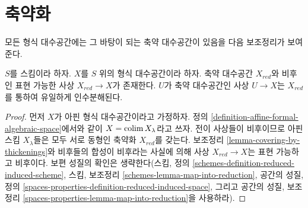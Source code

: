 \section{축약화}
\label{section-reduction}

\noindent
모든 형식 대수공간에는 그 바탕이 되는 축약 대수공간이 있음을 다음
보조정리가 보여 준다.

\begin{lemma}
\label{lemma-reduction-formal-algebraic-space}
$S$를 스킴이라 하자. $X$를 $S$ 위의 형식 대수공간이라 하자.
축약 대수공간 $X_{red}$와 비후인 표현 가능한 사상
$X_{red} \to X$가 존재한다. $U$가 축약 대수공간인 사상
$U \to X$는 $X_{red}$를 통하여 유일하게 인수분해된다.
\end{lemma}

\begin{proof}
먼저 $X$가 아핀 형식 대수공간이라고 가정하자. 정의
\ref{definition-affine-formal-algebraic-space}에서와 같이
$X = \mathop{\mathrm{colim}}\nolimits X_\lambda$라고 쓰자. 전이 사상들이 비후이므로 아핀
스킴 $X_\lambda$들은 모두 서로 동형인 축약화 $X_{red}$를 갖는다.
보조정리 \ref{lemma-covering-by-thickenings}와 비후들의 합성이
비후라는 사실에 의해 사상 $X_{red} \to X$는 표현 가능하고
비후이다. 보편 성질의 확인은 생략한다(스킴, 정의
\ref{schemes-definition-reduced-induced-scheme}, 스킴, 보조정리
\ref{schemes-lemma-map-into-reduction}, 공간의 성질, 정의
\ref{spaces-properties-definition-reduced-induced-space}, 그리고
공간의 성질, 보조정리
\ref{spaces-properties-lemma-map-into-reduction}을 사용하라).


\end{proof}
